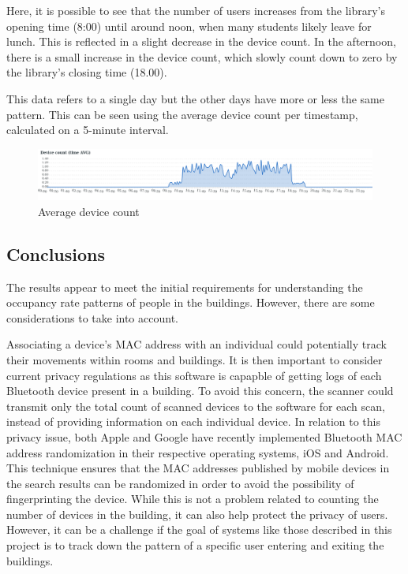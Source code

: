 \documentclass[a4paper, 11pt]{article}
\begin{document}
Here, it is possible to see that the number of users increases from the library's opening time (8:00) until around noon, when many students likely leave for lunch. This is reflected in a slight decrease in the device count. In the afternoon, there is a small increase in the device count, which slowly count down to zero by the library's closing time (18.00).

This data refers to a single day but the other days have more or less the same pattern. This can be seen using the average device count per timestamp, calculated on a 5-minute interval.

\begin{figure}[H]
    \centering
    \includegraphics[width=1\linewidth]{images/reyw2zjfg.png}
    \caption{Average device count}
\end{figure}

\subsection{Conclusions}
The results appear to meet the initial requirements for understanding the occupancy rate patterns of people in the buildings. However, there are some considerations to take into account.

Associating a device's MAC address with an individual could potentially track their movements within rooms and buildings. It is then important to consider current privacy regulations as this software is capapble of getting logs of each Bluetooth device present in a building. To avoid this concern, the scanner could transmit only the total count of scanned devices to the software for each scan, instead of providing information on each individual device. In relation to this privacy issue, both Apple and Google have recently implemented Bluetooth MAC address randomization in their respective operating systems, iOS and Android. This technique ensures that the MAC addresses published by mobile devices in the search results can be randomized in order to avoid the possibility of fingerprinting the device. While this is not a problem related to counting the number of devices in the building, it can also help protect the privacy of users. However, it can be a challenge if the goal of systems like those described in this project is to track down the pattern of a specific user entering and exiting the buildings.
\end{document}
